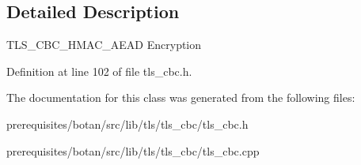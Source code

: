\subsection{Detailed Description}
T\+L\+S\+\_\+\+C\+B\+C\+\_\+\+H\+M\+A\+C\+\_\+\+A\+E\+AD Encryption 

Definition at line 102 of file tls\+\_\+cbc.\+h.



The documentation for this class was generated from the following files\+:\begin{DoxyCompactItemize}
\item 
prerequisites/botan/src/lib/tls/tls\+\_\+cbc/tls\+\_\+cbc.\+h\item 
prerequisites/botan/src/lib/tls/tls\+\_\+cbc/tls\+\_\+cbc.\+cpp\end{DoxyCompactItemize}
